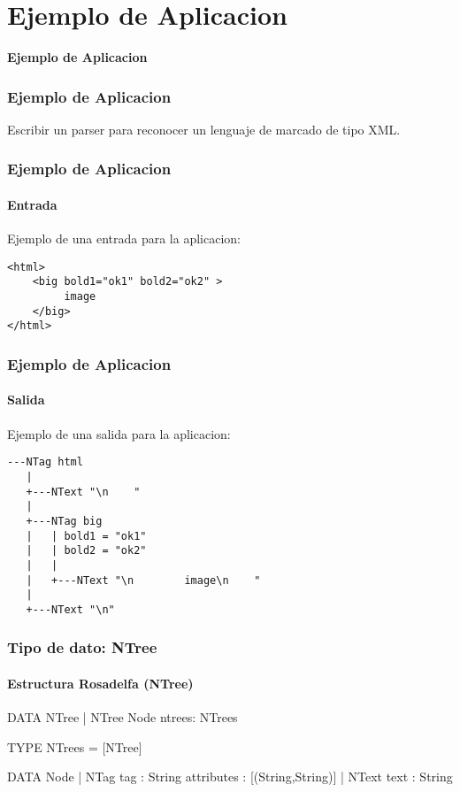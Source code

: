 \documentclass[12pt]{beamer}
\begin{document}
\section[Aplicacion]{Ejemplo de Aplicacion}
\begin{frame}
\begin{center}
	\textbf{\Large Ejemplo de Aplicacion}
\end{center}
\end{frame}

\begin{frame}
\frametitle{Ejemplo de Aplicacion}
Escribir un parser para reconocer un lenguaje de marcado de tipo XML.
\end{frame}

\begin{frame}[fragile]
\frametitle{Ejemplo de Aplicacion}
\framesubtitle{Entrada}
Ejemplo de una entrada para la aplicacion:
\begin{block}{}
\begin{verbatim}
<html>
    <big bold1="ok1" bold2="ok2" >
         image
    </big>
</html>
\end{verbatim}
\end{block}

\end{frame}

\begin{frame}[fragile]
\frametitle{Ejemplo de Aplicacion}
\framesubtitle{Salida}
Ejemplo de una salida para la aplicacion:
\begin{block}{}
\begin{verbatim}
---NTag html
   |
   +---NText "\n    "
   |
   +---NTag big
   |   | bold1 = "ok1"
   |   | bold2 = "ok2"
   |   |
   |   +---NText "\n        image\n    "
   |
   +---NText "\n"
\end{verbatim}
\end{block}
\end{frame}


\begin{frame}[fragile]
\frametitle{Tipo de dato: NTree}
\framesubtitle{Estructura Rosadelfa (NTree)}
\begin{block}{}
\begin{ag}
DATA NTree
  | NTree Node ntrees: NTrees

TYPE NTrees = [NTree]

DATA Node
  | NTag   tag          : String
           attributes   : {[(String,String)]}
  | NText  text         : String
\end{ag}
\end{block}
\end{frame}
\end{document}
